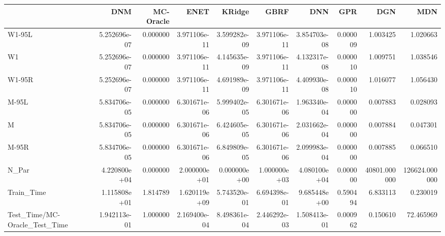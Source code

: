\begin{tabular}{lrrrrrrrrr}
\toprule
{} &           DNM &  MC-Oracle &          ENET &        KRidge &          GBRF &           DNN &       GPR &           DGN &            MDN \\
\midrule
W1-95L                        &  5.252696e-07 &   0.000000 &  3.971106e-11 &  3.599282e-09 &  3.971106e-11 &  3.854703e-08 &  0.000009 &      1.003425 &       1.020663 \\
W1                            &  5.252696e-07 &   0.000000 &  3.971106e-11 &  4.145635e-09 &  3.971106e-11 &  4.132317e-08 &  0.000010 &      1.009751 &       1.038546 \\
W1-95R                        &  5.252696e-07 &   0.000000 &  3.971106e-11 &  4.691989e-09 &  3.971106e-11 &  4.409930e-08 &  0.000010 &      1.016077 &       1.056430 \\
M-95L                         &  5.834706e-05 &   0.000000 &  6.301671e-06 &  5.999402e-05 &  6.301671e-06 &  1.963340e-04 &  0.000000 &      0.007883 &       0.028093 \\
M                             &  5.834706e-05 &   0.000000 &  6.301671e-06 &  6.424605e-05 &  6.301671e-06 &  2.031662e-04 &  0.000000 &      0.007884 &       0.047301 \\
M-95R                         &  5.834706e-05 &   0.000000 &  6.301671e-06 &  6.849809e-05 &  6.301671e-06 &  2.099983e-04 &  0.000000 &      0.007885 &       0.066510 \\
N\_Par                         &  4.220800e+04 &   0.000000 &  2.000000e+01 &  0.000000e+00 &  1.000000e+03 &  4.080100e+04 &  0.000000 &  40801.000000 &  126624.000000 \\
Train\_Time                    &  1.115808e+01 &   1.814789 &  1.620119e+09 &  5.743520e-01 &  6.694398e-01 &  9.685448e+00 &  0.590494 &      6.833113 &       0.230019 \\
Test\_Time/MC-Oracle\_Test\_Time &  1.942113e-01 &   1.000000 &  2.169400e-04 &  8.498361e-04 &  2.446292e-03 &  1.508413e-01 &  0.000962 &      0.150610 &      72.465969 \\
\bottomrule
\end{tabular}
